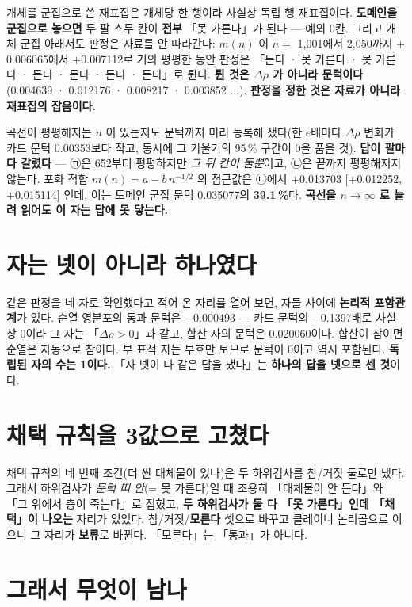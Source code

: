 \documentclass[10pt]{article}
\begin{document}
개체를 군집으로 쓴 재표집은 개체당 한 행이라 사실상 독립 행 재표집이다. \textbf{도메인을
군집으로 놓으면} 두 팔 스무 칸이 \textbf{전부} 「못 가른다」가 된다 --- 예외 0칸. 그리고
개체 군집 아래서도 판정은 자료를 안 따라간다: $m(n)$ 이 $n=$ 1,001에서 2,050까지
$+$0.006065에서 $+$0.007112로 거의 평평한 동안 판정은 「든다 · 못 가른다 · 못 가른다 ·
든다 · 든다 · 든다 · 든다」로 튄다. \textbf{튄 것은 $\Delta\rho$ 가 아니라 문턱이다}
(0.004639 · 0.012176 · 0.008217 · 0.003852 $\dots$). \textbf{판정을 정한 것은 자료가
아니라 재표집의 잡음이다.}

곡선이 평평해지는 $n$ 이 있는지도 문턱까지 미리 등록해 쟀다(한 $e$배마다 $\Delta\rho$
변화가 카드 문턱 0.00353보다 작고, 동시에 그 기울기의 95\,\% 구간이 0을 품을 것).
\textbf{답이 팔마다 갈렸다} --- ㉠은 652부터 평평하지만 \emph{그 뒤 칸이 둘뿐}이고,
㉡은 끝까지 평평해지지 않는다. 포화 적합 $m(n)=a-b\,n^{-1/2}$ 의 점근값은 ㉡에서
$+$0.013703 $[+$0.012252, $+$0.015114$]$ 인데, 이는 도메인 군집 문턱 0.035077의
\textbf{39.1\,\%}다. \textbf{곡선을 $n\to\infty$ 로 늘려 읽어도 이 자는 답에 못 닿는다.}

\section{자는 넷이 아니라 하나였다}

같은 판정을 네 자로 확인했다고 적어 온 자리를 열어 보면, 자들 사이에 \textbf{논리적
포함관계}가 있다. 순열 영분포의 통과 문턱은 $-$0.000493 --- 카드 문턱의 $-$0.1397배로
사실상 0이라 그 자는 「$\Delta\rho>0$」과 같고, 합산 자의 문턱은 0.020060이다. 합산이
참이면 순열은 자동으로 참이다. 부 표적 자는 부호만 보므로 문턱이 0이고 역시 포함된다.
\textbf{독립된 자의 수는 1이다.} 「자 넷이 다 같은 답을 냈다」는 \textbf{하나의 답을 넷으로
센 것}이다.

\section{채택 규칙을 3값으로 고쳤다}

채택 규칙의 네 번째 조건(더 싼 대체물이 있나)은 두 하위검사를 참/거짓 둘로만 냈다.
그래서 하위검사가 \emph{문턱 띠 안}(= 못 가른다)일 때 조용히 「대체물이 안 든다」와
「그 위에서 층이 죽는다」로 접혔고, \textbf{두 하위검사가 둘 다 「못 가른다」인데 「채택」이
나오는} 자리가 있었다. 참/거짓/\textbf{모른다} 셋으로 바꾸고 클레이니 논리곱으로 이으니
그 자리가 \textbf{보류}로 바뀐다. 「모른다」는 「통과」가 아니다.

\section{그래서 무엇이 남나}
\end{document}
